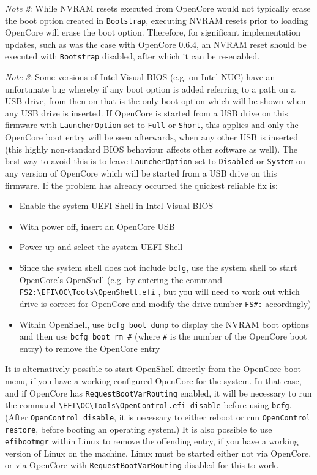 \documentclass[]{article}
\providecommand{\tightlist}{%
  \setlength{\itemsep}{0pt}\setlength{\parskip}{0pt}}
\begin{document}
\begin{enumerate}
  \emph{Note 2}: While NVRAM resets executed from OpenCore would not typically erase the boot option
  created in \texttt{Bootstrap}, executing NVRAM resets prior to loading OpenCore will erase the boot
  option. Therefore, for significant implementation updates, such as was the case with OpenCore 0.6.4,
  an NVRAM reset should be executed with \texttt{Bootstrap} disabled, after which it can be re-enabled.

  \emph{Note 3}: Some versions of Intel Visual BIOS (e.g. on Intel NUC) have an unfortunate bug whereby if any boot
  option is added referring to a path on a USB drive, from then on that is the only boot option which will be shown
  when any USB drive is inserted. If OpenCore is started from a USB drive on this firmware with
  \texttt{LauncherOption} set to \texttt{Full} or \texttt{Short}, this applies and only the OpenCore boot entry will be
  seen afterwards, when any other USB is inserted (this highly non-standard BIOS behaviour affects other software as well).
  The best way to avoid this is to leave \texttt{LauncherOption} set to \texttt{Disabled} or \texttt{System} on any
  version of OpenCore which will be started from a USB drive on this firmware. If the problem has already
  occurred the quickest reliable fix is:
  \begin{itemize}
  \tightlist
    \item Enable the system UEFI Shell in Intel Visual BIOS
    \item With power off, insert an OpenCore USB
    \item Power up and select the system UEFI Shell
    \item Since the system shell does not include \texttt{bcfg}, use the system shell to start OpenCore's OpenShell
    (e.g. by entering the command \texttt{FS2:\textbackslash EFI\textbackslash OC\textbackslash Tools\textbackslash OpenShell.efi} ,
    but you will need to work out which drive is correct for OpenCore and modify the drive number \texttt{FS\#:} accordingly)
    \item Within OpenShell, use \texttt{bcfg boot dump} to display the NVRAM boot options and then use \texttt{bcfg boot rm \#}
    (where \texttt{\#} is the number of the OpenCore boot entry) to remove the OpenCore entry
  \end{itemize}
  It is alternatively possible to start OpenShell directly from the OpenCore boot menu, if you have
  a working configured OpenCore for the system. In that case, and if OpenCore has \texttt{RequestBootVarRouting} enabled, it will be
  necessary to run the command \texttt{\textbackslash EFI\textbackslash OC\textbackslash Tools\textbackslash OpenControl.efi disable}
  before using \texttt{bcfg}. (After \texttt{OpenControl disable}, it is necessary to either reboot or run \texttt{OpenControl restore},
  before booting an operating system.)
  It is also possible to use \texttt{efibootmgr} within Linux to remove the offending entry, if you have a working
  version of Linux on the machine. Linux must be started either not via OpenCore, or via OpenCore with \texttt{RequestBootVarRouting} disabled
  for this to work.
  

\end{enumerate}
\end{document}
